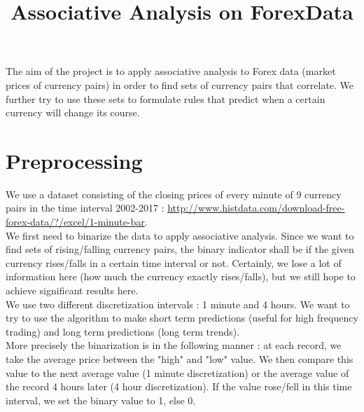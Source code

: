 \documentclass[paper=a4,fontsize=11pt,DIV=8,BCOR=5mm,twoside,pdftex]{scrartcl}
\title{Associative Analysis on ForexData}
\begin{document}
	\maketitle

	The aim of the project is to apply associative analysis to Forex data (market prices of currency pairs) in order to find sets of currency pairs that correlate. We further try to use these sets to formulate rules that predict when a certain currency will change its course.
	
	\section{Preprocessing}
	
	We use a dataset consisting of the closing prices of every minute of 9 currency pairs in the time interval 2002-2017 : \url{http://www.histdata.com/download-free-forex-data/?/excel/1-minute-bar}.\\
	
	We first need to binarize the data to apply associative analysis. Since we want to find sets of rising/falling currency pairs, the binary indicator shall be if the given currency rises/falls in a certain time interval or not. Certainly, we lose a lot of information here (how much the currency exactly rises/falls), but we still hope to achieve significant results here.\\

	We use two different discretization intervals : 1 minute and 4 hours. We want to try to use the algorithm to make short term predictions (useful for high frequency trading) and long term predictions (long term trends).\\
	
	More precisely the binarization is in the following manner : at each record, we take the average price between the "high" and "low" value. We then compare this value to the next average value (1 minute discretization) or the average value of the record 4 hours later (4 hour discretization). If the value rose/fell in this time interval, we set the binary value to 1, else 0.\\
	
\end{document}
